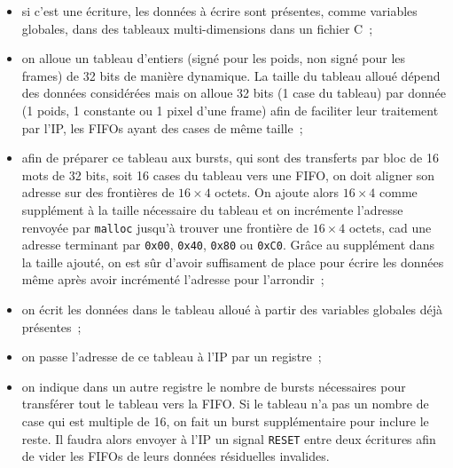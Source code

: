 \begin{itemize}
	\item si c'est une écriture, les données à écrire sont présentes, comme
		variables globales, dans des tableaux multi-dimensions dans un
		fichier C~;
	\item on alloue un tableau d'entiers (signé pour les poids, non signé
		pour les frames) de 32 bits de manière dynamique. La taille
		du tableau alloué dépend des données considérées mais on alloue
		32 bits (1 case du tableau) par donnée (1 poids, 1 constante ou
		1 pixel d'une frame) afin de faciliter leur traitement par l'IP,
		les FIFOs ayant des cases de même taille~;
	\item afin de préparer ce tableau aux bursts, qui sont des transferts
		par bloc
		de 16 mots de 32 bits, soit 16 cases du tableau vers une FIFO,
		on doit aligner son adresse sur des frontières de $16 \times
		4$ octets. On ajoute alors $16 \times 4$ comme supplément à la
		taille nécessaire du tableau et on incrémente l'adresse
		renvoyée par \texttt{malloc} jusqu'à trouver une frontière de
		$16 \times 4$ octets, cad une adresse terminant par
		\texttt{0x00}, \texttt{0x40}, \texttt{0x80} ou \texttt{0xC0}.
		Grâce au supplément dans la taille ajouté, on est sûr d'avoir
		suffisament de place pour écrire les données même après avoir
		incrémenté l'adresse pour l'arrondir~;
	\item on écrit les données dans le tableau alloué à partir des
		variables globales déjà présentes~;
	\item on passe l'adresse de ce tableau à l'IP par un registre~;
	\item on indique dans un autre registre le nombre de bursts nécessaires
		pour transférer tout le tableau vers la FIFO. Si le tableau n'a
		pas un nombre de case qui est multiple de 16, on fait un burst
		supplémentaire pour inclure le reste. Il faudra alors
		envoyer à l'IP un signal \texttt{RESET} entre deux écritures
		afin de vider les FIFOs de leurs données résiduelles invalides.
\end{itemize}
